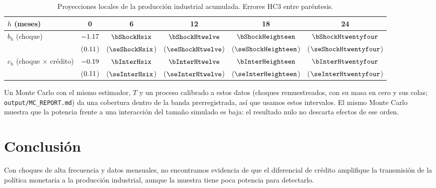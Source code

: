 \documentclass[11pt]{article}
\begin{document}
\begin{table}[h]
\centering
\begin{tabular}{lccccc}
\toprule
$h$ (meses) & 0 & 6 & 12 & 18 & 24 \\
\midrule
$b_h$ (choque) & $-1.17$ & $\bShockHsix$ & $\bShockHtwelve$ & $\bShockHeighteen$ & $\bShockHtwentyfour$ \\
 & ($0.11$) & ($\seShockHsix$) & ($\seShockHtwelve$) & ($\seShockHeighteen$) & ($\seShockHtwentyfour$) \\
$c_h$ (choque $\times$ crédito) & $-0.19$ & $\bInterHsix$ & $\bInterHtwelve$ & $\bInterHeighteen$ & $\bInterHtwentyfour$ \\
 & ($0.11$) & ($\seInterHsix$) & ($\seInterHtwelve$) & ($\seInterHeighteen$) & ($\seInterHtwentyfour$) \\
\bottomrule
\end{tabular}
\caption{Proyecciones locales de la producción industrial acumulada. Errores HC3 entre paréntesis.}
\end{table}

Un Monte Carlo con el mismo estimador, $T$ y un proceso calibrado a estos datos (choques remuestreados, con su masa en
cero y sus colas; \texttt{output/MC\_REPORT.md}) da una cobertura dentro de la banda prerregistrada, así que usamos estos
intervalos. El mismo Monte Carlo muestra que la potencia frente a una interacción del tamaño simulado es baja: el
resultado nulo no descarta efectos de ese orden.

\section{Conclusión}
Con choques de alta frecuencia y datos mensuales, no encontramos evidencia de que el diferencial de crédito amplifique la
transmisión de la política monetaria a la producción industrial, aunque la muestra tiene poca potencia para detectarlo.
\end{document}
